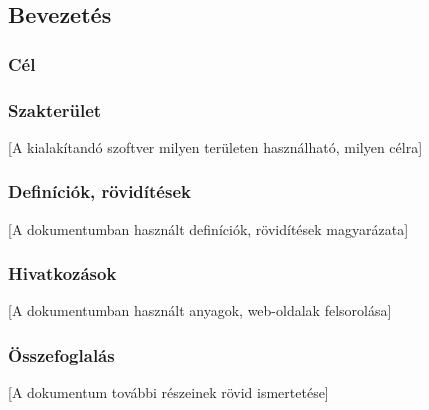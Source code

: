 

\subsection{Bevezetés}


\subsubsection{Cél}


\subsubsection{Szakterület}

[A kialakítandó szoftver milyen területen használható, milyen célra]

\subsubsection{Definíciók, rövidítések}

[A dokumentumban használt definíciók, rövidítések magyarázata]

\subsubsection{Hivatkozások}

[A dokumentumban használt anyagok, web-oldalak felsorolása]

\subsubsection{Összefoglalás}

[A dokumentum további részeinek rövid ismertetése]